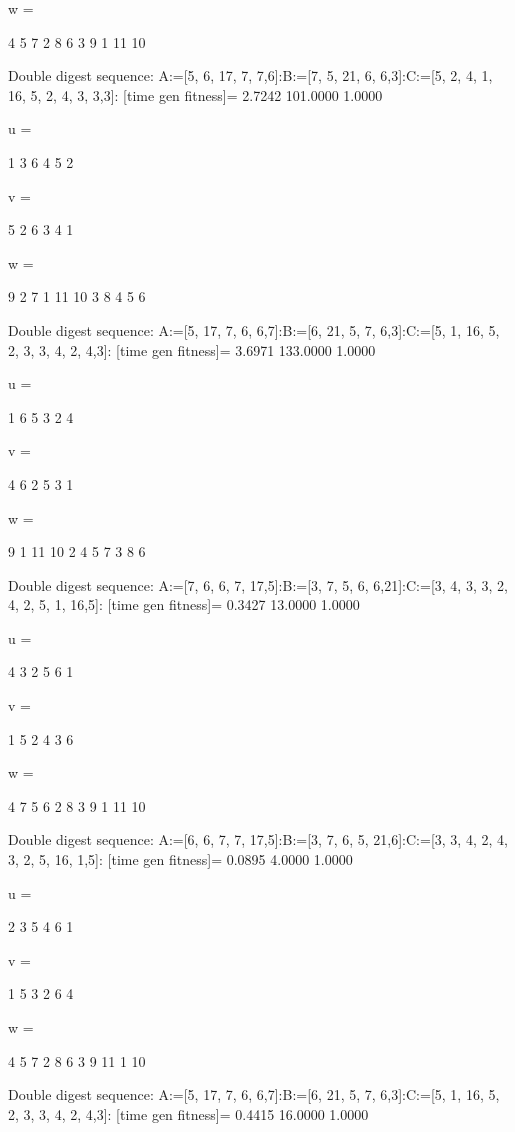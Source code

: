 w =

     4     5     7     2     8     6     3     9     1    11    10

Double digest sequence:
A:=[5, 6, 17, 7, 7,6]:B:=[7, 5, 21, 6, 6,3]:C:=[5, 2, 4, 1, 16, 5, 2, 4, 3, 3,3]:
[time gen fitness]=
    2.7242  101.0000    1.0000


u =

     1     3     6     4     5     2


v =

     5     2     6     3     4     1


w =

     9     2     7     1    11    10     3     8     4     5     6

Double digest sequence:
A:=[5, 17, 7, 6, 6,7]:B:=[6, 21, 5, 7, 6,3]:C:=[5, 1, 16, 5, 2, 3, 3, 4, 2, 4,3]:
[time gen fitness]=
    3.6971  133.0000    1.0000


u =

     1     6     5     3     2     4


v =

     4     6     2     5     3     1


w =

     9     1    11    10     2     4     5     7     3     8     6

Double digest sequence:
A:=[7, 6, 6, 7, 17,5]:B:=[3, 7, 5, 6, 6,21]:C:=[3, 4, 3, 3, 2, 4, 2, 5, 1, 16,5]:
[time gen fitness]=
    0.3427   13.0000    1.0000


u =

     4     3     2     5     6     1


v =

     1     5     2     4     3     6


w =

     4     7     5     6     2     8     3     9     1    11    10

Double digest sequence:
A:=[6, 6, 7, 7, 17,5]:B:=[3, 7, 6, 5, 21,6]:C:=[3, 3, 4, 2, 4, 3, 2, 5, 16, 1,5]:
[time gen fitness]=
    0.0895    4.0000    1.0000


u =

     2     3     5     4     6     1


v =

     1     5     3     2     6     4


w =

     4     5     7     2     8     6     3     9    11     1    10

Double digest sequence:
A:=[5, 17, 7, 6, 6,7]:B:=[6, 21, 5, 7, 6,3]:C:=[5, 1, 16, 5, 2, 3, 3, 4, 2, 4,3]:
[time gen fitness]=
    0.4415   16.0000    1.0000


